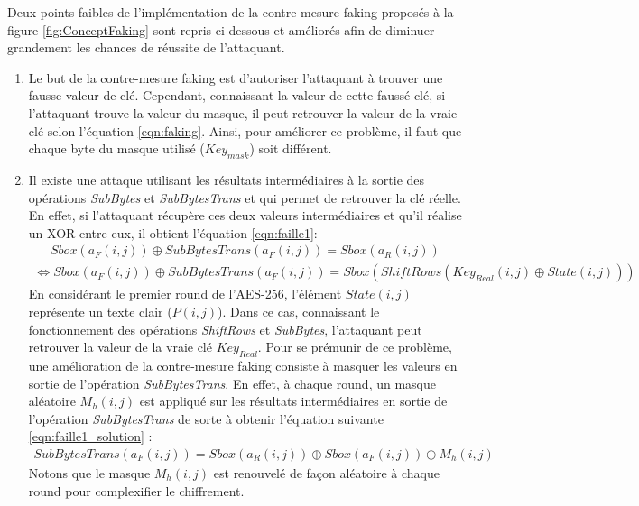 \documentclass[oneside]{book}
\begin{document}
Deux points faibles de l'implémentation de la contre-mesure faking proposés à la figure \ref{fig:ConceptFaking} sont repris ci-dessous et améliorés afin de diminuer grandement les chances de réussite de l'attaquant.
\begin{enumerate}
\item Le but de la contre-mesure faking est d'autoriser l'attaquant à trouver une fausse valeur de clé. Cependant, connaissant la valeur de cette faussé clé, si l'attaquant trouve la valeur du masque, il peut retrouver la valeur de la vraie clé selon l'équation \ref{eqn:faking}. Ainsi, pour améliorer ce problème, il faut que chaque byte du masque utilisé ($Key_{mask}$) soit différent. 
\item Il existe une attaque utilisant les résultats intermédiaires à la sortie des opérations \textit{SubBytes} et \textit{SubBytesTrans} et qui permet de retrouver la clé réelle. En effet, si l'attaquant récupère ces deux valeurs intermédiaires et qu'il réalise un XOR entre eux, il obtient l'équation \ref{eqn:faille1}: 
\begin{gather}
	Sbox(a_{F}(i,j)) \oplus SubBytesTrans(a_{F}(i,j)) = Sbox(a_{R}(i,j)) 
\end{gather}
\begin{gather}
	\Leftrightarrow Sbox(a_{F}(i,j)) \oplus SubBytesTrans(a_{F}(i,j)) = Sbox(ShiftRows(Key_{Real}(i,j) \oplus State(i,j))) \label{eqn:faille1}
\end{gather}
En considérant le premier round de l'AES-256, l'élément $State(i,j)$ représente un texte clair ($P(i,j)$). Dans ce cas, connaissant le fonctionnement des opérations \textit{ShiftRows} et \textit{SubBytes}, l'attaquant peut retrouver la valeur de la vraie clé $Key_{Real}$. Pour se prémunir de ce problème, une amélioration de la contre-mesure faking consiste à masquer les valeurs en sortie de l'opération \textit{SubBytesTrans}. En effet, à chaque round, un masque aléatoire $M_{h}(i,j)$ est appliqué sur les résultats intermédiaires en sortie de l'opération \textit{SubBytesTrans} de sorte à obtenir l'équation suivante \ref{eqn:faille1_solution} : 
\begin{gather}
	SubBytesTrans(a_{F}(i,j)) = Sbox(a_{R}(i,j))  \oplus Sbox(a_{F}(i,j)) \oplus M_{h}(i,j) \label{eqn:faille1_solution}
\end{gather}
Notons que le masque $M_{h}(i,j)$ est renouvelé de façon aléatoire à chaque round pour complexifier le chiffrement.
\end{enumerate}

\newpage
\end{document}
